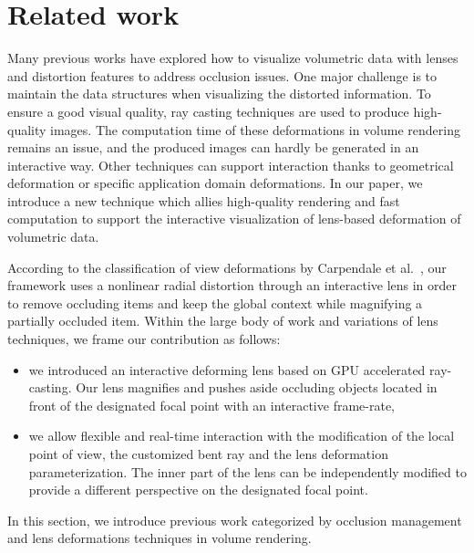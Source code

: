 \section{Related work}

Many previous works have explored how to visualize volumetric data with lenses and distortion features to address occlusion issues. One major challenge is to maintain the data structures when visualizing the distorted information. To ensure a good visual quality, ray casting techniques are used to produce high-quality images. The computation time of these deformations in volume rendering remains an issue, and the produced images can hardly be generated in an interactive way. Other techniques can support interaction thanks to geometrical deformation or specific application domain deformations.
In our paper, we introduce a new technique which allies high-quality rendering and fast computation to support the interactive visualization of lens-based deformation of volumetric data.

According to the classification of view deformations by Carpendale et al.~\cite{595268}, our framework uses a nonlinear radial distortion through an interactive lens in order to remove occluding items and keep the global context while magnifying a partially occluded item. Within the large body of work and variations of lens techniques, we frame our contribution as follows:
\begin{itemize}
\item we introduced an interactive deforming lens based on GPU accelerated ray-casting. Our lens magnifies and pushes aside occluding objects located in front of the designated focal point with an interactive frame-rate,
\item we allow flexible and real-time interaction with the modification of the local point of view, the customized bent ray and the lens deformation parameterization. The inner part of the lens can be independently modified to provide a different perspective on the designated focal point. 
\end{itemize}

In this section, we introduce previous work categorized by occlusion management and lens deformations techniques in volume rendering. 


